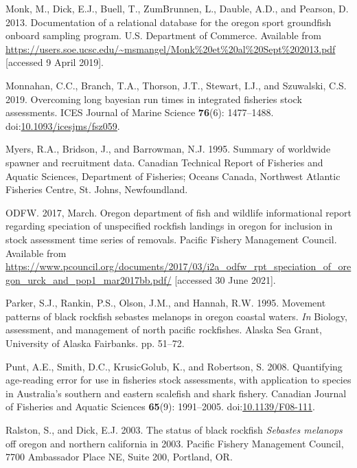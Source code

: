 \documentclass[11pt,
  letterpaper,
]{article}
\newlength{\cslhangindent}
\newenvironment{CSLReferences}[2] %
 {%
  \setlength{\parindent}{0pt}
  \ifodd #1 \everypar{\setlength{\hangindent}{\cslhangindent}}\ignorespaces\fi
  \ifnum #2 > 0
  \setlength{\parskip}{#2\baselineskip}
  \fi
 }%
 {}
\begin{document}
\begin{CSLReferences}{1}{0}
\leavevmode{}%
Monk, M., Dick, E.J., Buell, T., ZumBrunnen, L., Dauble, A.D., and Pearson, D. 2013. Documentation of a relational database for the oregon sport groundfish onboard sampling program. U.S. Department of Commerce. Available from \url{https://users.soe.ucsc.edu/~msmangel/Monk\%20et\%20al\%20Sept\%202013.pdf} {[}accessed 9 April 2019{]}.

\leavevmode{}%
Monnahan, C.C., Branch, T.A., Thorson, J.T., Stewart, I.J., and Szuwalski, C.S. 2019. Overcoming long bayesian run times in integrated fisheries stock assessments. {ICES} Journal of Marine Science \textbf{76}(6): 1477--1488. doi:\href{https://doi.org/10.1093/icesjms/fsz059}{10.1093/icesjms/fsz059}.

\leavevmode{}%
Myers, R.A., Bridson, J., and Barrowman, N.J. 1995. Summary of worldwide spawner and recruitment data. Canadian Technical Report of Fisheries and Aquatic Sciences, Department of Fisheries; Oceans Canada, Northwest Atlantic Fisheries Centre, St. Johns, Newfoundland.

\leavevmode{}%
ODFW. 2017, March. Oregon department of fish and wildlife informational report regarding speciation of unspecified rockfish landings in oregon for inclusion in stock assessment time series of removals. Pacific Fishery Management Council. Available from \url{https://www.pcouncil.org/documents/2017/03/i2a_odfw_rpt_speciation_of_oregon_urck_and_pop1_mar2017bb.pdf/} {[}accessed 30 June 2021{]}.

\leavevmode{}%
Parker, S.J., Rankin, P.S., Olson, J.M., and Hannah, R.W. 1995. Movement patterns of black rockfish sebastes melanops in oregon coastal waters. \emph{In} Biology, assessment, and management of north pacific rockfishes. Alaska Sea Grant, University of Alaska Fairbanks. pp. 51--72.

\leavevmode{}%
Punt, A.E., Smith, D.C., KrusicGolub, K., and Robertson, S. 2008. Quantifying age-reading error for use in fisheries stock assessments, with application to species in {A}ustralia's southern and eastern scalefish and shark fishery. Canadian Journal of Fisheries and Aquatic Sciences \textbf{65}(9): 1991--2005. doi:\href{https://doi.org/10.1139/F08-111}{10.1139/F08-111}.

\leavevmode{}%
Ralston, S., and Dick, E.J. 2003. The status of black rockfish \emph{{Sebastes} melanops} off oregon and northern california in 2003. Pacific Fishery Management Council, 7700 Ambassador Place NE, Suite 200, Portland, OR.


\end{CSLReferences}
\end{document}

